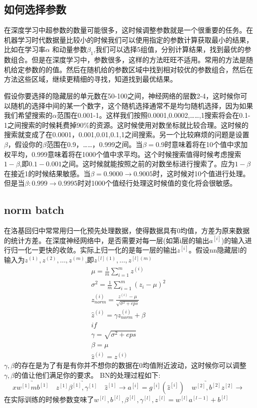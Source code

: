 \subsection{如何选择参数}
在深度学习中超参数的数量可能很多，这时候调整参数就是一个很重要的任务。在机器学习时代数据量比较小的时候我们可以使用指定的参数计算获取最小的结果，比如在学习率$\alpha$
和动量参数$\beta_1$,我们可以选择5组值，分别计算结果，找到最优的参数组合。但是在深度学习中，参数很多，这样的方法旺旺不适用。常用的方法是随机给定参数的的值。然后在随机给的参数区域中找到相对较优的参数组合，然后在方法这些区域，继续更精细的寻找，知道找到最优结果。

假设你要选择的隐藏层的单元数在50-100之间，神经网络的层数2-4，这时候你可以随机的选择中间的某一个数字，这个随机选择通常不是均匀随机选择，因为如果我们希望搜索的$\alpha$范围在0.001-1。这样我们按照0.0001,0.0002,……,1搜索将会在0.1-1之间搜索的时候耗费掉90\%的资源。这时候使用对数坐标就比较合理。这时候的搜索就变成了在0.0001，0.001,0.01,0.1,1之间搜索。另一个比较麻烦的问题是设置$\beta$，假设你的$\beta$范围在0.9，……，0.999之间。当$\beta=0.9$时意味着将在10个值中求加权平均，0.999意味着将在1000个值中求平均。这个时候搜索值得时候考虑搜索$1-\beta$,即$0.1-0.001$之间。这时候就能按照之前的对数坐标进行搜索了。应为$1-\beta$在接近1的时候结果敏感。当$\beta=0.9000\rightarrow 0.9005$时，这时候对10个值进行处理。但是当$\beta:0.999\rightarrow 0.9995$时对1000个值经行处理这时候值的变化将会很敏感。
\subsection{norm batch}
在洛基回归中常常用归一化预先处理数据，使得数据具有0均值，方差为原来数据的统计方差。在深度神经网络中，是否需要对每一层(如第i层的输出$a^{[i]}$)的输入进行归一化一更快的收敛。实际上归一化的是每一层的输出$z^{[i]}$。假设nn隐藏层l的输入为$z^{(1)},z^{(2)},\ldots,z^{(m)}$,即$z^{[l](1)},\ldots,z^{[l](m)}$
\begin{equation}
\begin{split}
\mu=\frac{1}{m}\sum_{i=1}^mz^{(i)}\\
\sigma^2=\frac{1}{m}\sum_{i=1}^m(z_i-\mu)^2\\
z^{(i)}_{norm}=\frac{z^{(i)}-\mu}{\sqrt{\sigma^2+eps}}\\
\hat{z}^{(i)}=\gamma z_{norm}^{(i)}+\beta\\
if\\
\gamma=\sqrt{\sigma^2+eps}\\
\beta=\mu\\
\hat{z}^{(i)}=z^{(i)}
\end{split}
\end{equation}
$\gamma,\beta$的存在是为了有是有你并不想你的数据在0均值附近波动，这时候你可以调整$\gamma,\beta$的值让他们满足你的要求。
BN的处理过程如下:
\[x\underrightarrow{w^{[1]}mb^{[1]}}\quad z^{[1]}\underrightarrow{\beta^{[1]},\gamma^{[1]}}\quad\hat{z}^{[1]}\rightarrow a^{[i]}=g^{[i]}(\hat{z}^{[i]})\quad \underrightarrow{w^{[2]},b^{[2]}}z^{[2]}\rightarrow\]
在实际训练的时候参数变味了$w^{[l]},b^{[l]},\beta^{[l]},\gamma^{[l]},z^{[l]}=w^{[l]}a^{[l-1]}+b^{[l]}$

